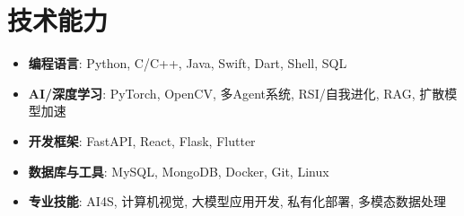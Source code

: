 \documentclass{resume}
\begin{document}
\section{技术能力}
\begin{itemize}[parsep=0.2ex]
  \item \textbf{编程语言}: Python, C/C++, Java, Swift, Dart, Shell, SQL
  \item \textbf{AI/深度学习}: PyTorch, OpenCV, 多Agent系统, RSI/自我进化, RAG, 扩散模型加速
  \item \textbf{开发框架}: FastAPI, React, Flask, Flutter
  \item \textbf{数据库与工具}: MySQL, MongoDB, Docker, Git, Linux
  \item \textbf{专业技能}: AI4S, 计算机视觉, 大模型应用开发, 私有化部署, 多模态数据处理
\end{itemize}

\end{document}
